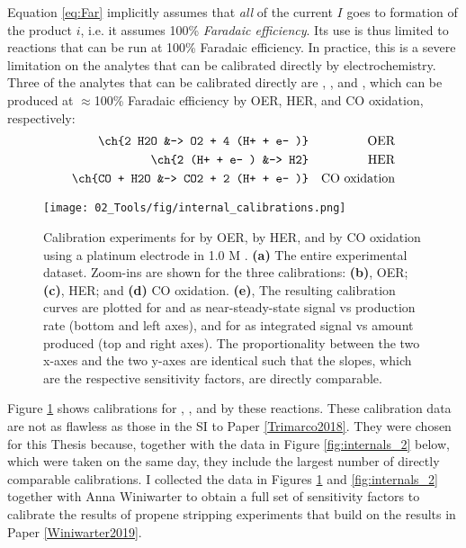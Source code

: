 Equation \ref{eq:Far} implicitly assumes that \textit{all} of the current $I$ goes to formation of the product $i$, i.e. it assumes 100\% \textit{Faradaic efficiency}. Its use is thus limited to reactions that can be run at 100\% Faradaic efficiency. In practice, this is a severe limitation on the analytes that can be calibrated directly by electrochemistry. Three of the analytes that can be calibrated directly are , , and , which can be produced at $\approx$100\% Faradaic efficiency by OER, HER, and CO oxidation, respectively:
\begin{align}
\ch{2 H2O &-> O2 + 4 (H+ + e- )} &&\text{OER}\label{rxn:OER2}\\
\ch{2 (H+ + e- ) &-> H2} &&\text{HER}\label{rxn:HER2p2}\\
\ch{CO + H2O &-> CO2 + 2 (H+ + e- )} &&\label{rxn:COox2}\text{CO oxidation}
\end{align}
\begin{figure}[h!]
	\texttt{[image: 02\_Tools/fig/internal\_calibrations.png]}
	\caption{Calibration experiments for  by OER,  by HER, and  by CO oxidation using a platinum electrode in 1.0 M . \textbf{(a)} The entire experimental dataset. Zoom-ins are shown for the three calibrations: \textbf{(b)}, OER; \textbf{(c)}, HER; and \textbf{(d)} CO oxidation. \textbf{(e)}, The resulting calibration curves are plotted for  and  as near-steady-state signal vs production rate (bottom and left axes), and for  as integrated signal vs amount produced (top and right axes). The proportionality between the two x-axes and the two y-axes are identical such that the slopes, which are the respective sensitivity factors, are directly comparable.
	}
	\label{fig:internals}
\end{figure}
\clearpage %
Figure \ref{fig:internals} shows calibrations for , , and  by these reactions. These calibration data are not as flawless as those in the SI to Paper \ref{Trimarco2018}. They were chosen for this Thesis because, together with the data in Figure \ref{fig:internals_2} below, which were taken on the same day, they include the largest number of directly comparable calibrations. I collected the data in Figures \ref{fig:internals} and \ref{fig:internals_2} together with Anna Winiwarter to obtain a full set of sensitivity factors to calibrate the results of propene stripping experiments that build on the results in Paper \ref{Winiwarter2019}.


